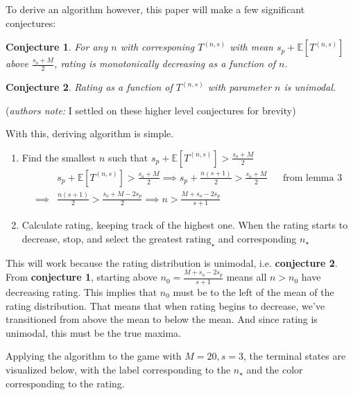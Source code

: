 \documentclass[a4paper]{article}
\newtheorem{conjecture}{Conjecture}
\begin{document}
To derive an algorithm however, this paper will make a few significant conjectures:
%
\begin{conjecture}
    For any $n$ with corresponing $T^{(n, s)}$ with mean $s_p + \mathbb{E}[T^{(n, s)}]$ above $\frac{s_o + M}{2}$, rating is monotonically decreasing as a function of $n$.
\end{conjecture}
%
\begin{conjecture}
    Rating as a function of $T^{(n, s)}$ with parameter $n$ is unimodal.
\end{conjecture}
%
(\textit{authors note:} I settled on these higher level conjectures for brevity)

With this, deriving algorithm is simple. 

\begin{enumerate}
\item Find the smallest $n$ such that $s_p + \mathbb{E}[T^{(n, s)}] > \frac{s_o + M}{2}$ 
%
\begin{align*}
    & s_p + \mathbb{E}[T^{(n, s)}] > \frac{s_o + M}{2} \implies s_p + \frac{n(s+1)}{2} > \frac{s_o + M}{2} && \text{from lemma 3} \\
    \implies &  \frac{n(s+1)}{2} > \frac{s_o + M - 2 s_p}{2} \implies n > \frac{M + s_o - 2 s_p}{s+1}
\end{align*}

\item Calculate rating, keeping track of the highest one. When the rating starts to decrease, stop, and select the greatest $\text{rating}_{\star}$ and corresponding $n_{\star}$
\end{enumerate}

This will work because the rating distribution is unimodal, i.e. \textbf{conjecture 2}. From \textbf{conjecture 1}, starting above $n_0 = \frac{M + s_o - 2 s_p}{s+1}$ means all $n > n_0$ have decreasing rating. This implies that $n_0$ must be to the left of the mean of the rating distribution. That means that when rating begins to decrease, we've transitioned from above the mean to below the mean. And since rating is unimodal, this must be the true maxima. \newline


Applying the algorithm to the game with $M = 20, s = 3$, the terminal states are visualized below, with the label corresponding to the $n_{\star}$ and the color corresponding to the rating.
\end{document}
